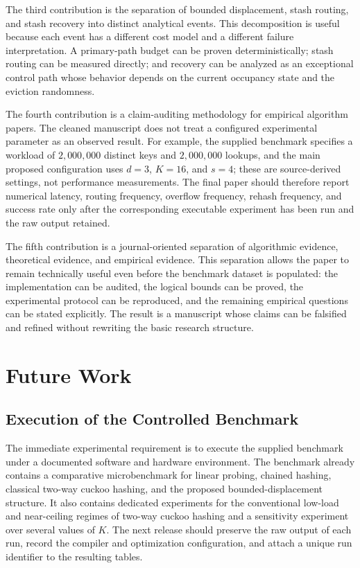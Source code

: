 \documentclass[conference]{IEEEtran}
\begin{document}
The third contribution is the separation of bounded displacement, stash routing, and stash recovery into distinct analytical events. This decomposition is useful because each event has a different cost model and a different failure interpretation. A primary-path budget can be proven deterministically; stash routing can be measured directly; and recovery can be analyzed as an exceptional control path whose behavior depends on the current occupancy state and the eviction randomness.

The fourth contribution is a claim-auditing methodology for empirical algorithm papers. The cleaned manuscript does not treat a configured experimental parameter as an observed result. For example, the supplied benchmark specifies a workload of $2{,}000{,}000$ distinct keys and $2{,}000{,}000$ lookups, and the main proposed configuration uses $d=3$, $K=16$, and $s=4$; these are source-derived settings, not performance measurements. The final paper should therefore report numerical latency, routing frequency, overflow frequency, rehash frequency, and success rate only after the corresponding executable experiment has been run and the raw output retained.

The fifth contribution is a journal-oriented separation of algorithmic evidence, theoretical evidence, and empirical evidence. This separation allows the paper to remain technically useful even before the benchmark dataset is populated: the implementation can be audited, the logical bounds can be proved, the experimental protocol can be reproduced, and the remaining empirical questions can be stated explicitly. The result is a manuscript whose claims can be falsified and refined without rewriting the basic research structure.

\section{Future Work}
\label{sec:future_work}

\subsection{Execution of the Controlled Benchmark}

The immediate experimental requirement is to execute the supplied benchmark under a documented software and hardware environment. The benchmark already contains a comparative microbenchmark for linear probing, chained hashing, classical two-way cuckoo hashing, and the proposed bounded-displacement structure. It also contains dedicated experiments for the conventional low-load and near-ceiling regimes of two-way cuckoo hashing and a sensitivity experiment over several values of $K$. The next release should preserve the raw output of each run, record the compiler and optimization configuration, and attach a unique run identifier to the resulting tables.
\end{document}
